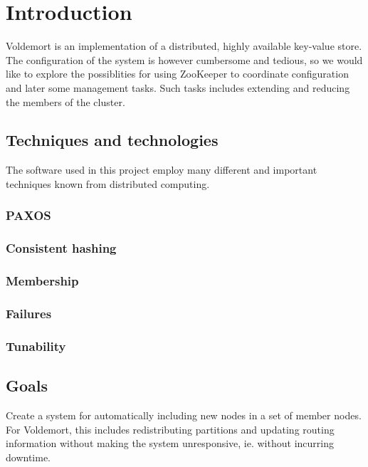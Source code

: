 
\section{Introduction}
Voldemort is an implementation of a distributed, highly available key-value store.
The configuration of the system is however cumbersome and tedious, so we would like to explore the possiblities for using ZooKeeper to coordinate configuration and later some management tasks.
Such tasks includes extending and reducing the members of the cluster.

\subsection{Techniques and technologies}
The software used in this project employ many different and important techniques known from distributed computing.

\subsubsection{PAXOS}

\subsubsection{Consistent hashing}

\subsubsection{Membership}

\subsubsection{Failures}

\subsubsection{Tunability}

\subsection{Goals}
Create a system for automatically including new nodes in a set of member nodes.
For Voldemort, this includes redistributing partitions and updating routing information without making the system unresponsive, ie. without incurring downtime.

\subsection{}

